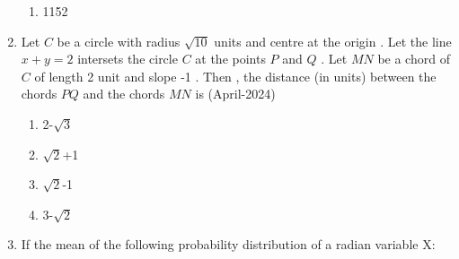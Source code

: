 \documentclass[journal,12pt,onecolumn]{IEEEtran}
\theoremstyle{remark}
\begin{document}
\begin{enumerate}
\begin{multicols}{2}
\begin{enumerate}
\item 1152
\end{enumerate}
\end{multicols}
\item Let $C$ be a circle with radius $\sqrt{10}$ units and centre at the origin . Let the line $x+y=2$ intersets the circle $C$ at the points $P$ and $Q$ . Let $MN$ be a chord of $C$ of length 2 unit and slope -1 . Then , the distance (in units) between the chords $PQ$ and the chords $MN$ is
\hfill{(April-2024)}
\begin{multicols}{2}
\begin{enumerate}
\item 2-$\sqrt{3}$
\item $\sqrt{2}$+1 
\item $\sqrt{2}$-1
\item 3-$\sqrt{2}$
\end{enumerate}
\end{multicols}
\item If the mean of the following probability distribution of a radian variable X:\\


\end{enumerate}
\end{document}
